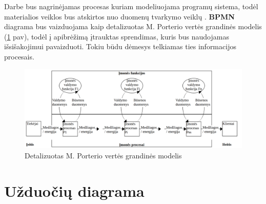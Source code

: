 \documentclass{VUMIFInfBakalaurinis}
\begin{document}
\begin{center}
\begin{longtable}{ | p{0.5cm} | p{2cm} |  p{7cm} | p{4cm} |}
    \hline
    \end{longtable}
\end{center}

Darbe bus nagrinėjamas procesas kuriam modeliuojama programų sistema, todėl materialios  veiklos bus atskirtos nuo duomenų tvarkymo veiklų \cite{bpmnPorterModel}. \textbf{BPMN} diagrama bus vaizduojama kaip detalizuotas M. Porterio vertės grandinės modelis (\ref{img:detalized_porter_vcm} pav), todėl į apibrėžimą įtrauktas sprendimas, kuris bus naudojamas išsišakojimui pavaizduoti. Tokiu būdu dėmesys telkiamas ties informacijos procesais.

\begin{figure}[H]
	\centering
	\includegraphics[width=\textwidth]{img/detalized_porter_vcm}
	\caption{Detalizuotas M. Porterio vertės grandinės modelis}
	\label{img:detalized_porter_vcm}
\end{figure} 


\section{Užduočių diagrama}
\end{document}
